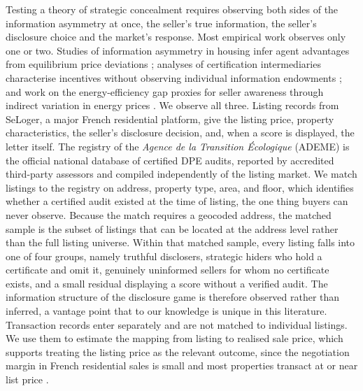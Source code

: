 Testing a theory of strategic concealment requires observing both sides of the information
asymmetry at once, the seller's true information, the seller's disclosure choice and the
market's response. Most empirical work observes only one or two. Studies of information
asymmetry in housing infer agent advantages from equilibrium price deviations
\citep{levitt_syverson_2008}; analyses of certification intermediaries characterise incentives
without observing individual information endowments \citep{lizzeri_1999}; and work on the
energy-efficiency gap proxies for seller awareness through indirect variation in energy prices
\citep{myers_asymmetric_2020}. We observe all three. Listing records from SeLoger, a major
French residential platform, give the listing price, property characteristics, the seller's
disclosure decision, and, when a score is displayed, the letter itself. The registry of the
\emph{Agence de la Transition \'Ecologique} (ADEME) is the official national database of
certified DPE audits, reported by accredited third-party assessors and compiled independently
of the listing market. We match listings to the registry on address, property type, area, and
floor, which identifies whether a certified audit existed at the time of listing, the one
thing buyers can never observe. Because the match requires a geocoded address, the matched
sample is the subset of listings that can be located at the address level rather than the full
listing universe. Within that matched sample, every listing falls into one of four groups, namely
truthful disclosers, strategic hiders who hold a certificate and omit it, genuinely uninformed
sellers for whom no certificate exists, and a small residual displaying a score without a
verified audit. The information structure of the disclosure game is therefore observed rather
than inferred, a vantage point that to our knowledge is unique in this literature. Transaction
records enter separately and are not matched to individual listings. We use them to estimate
the mapping from listing to realised sale price, which supports treating the listing price as
the relevant outcome, since the negotiation margin in French residential sales is small and
most properties transact at or near list price
\citep{merlo_bargaining_2004, genesove_loss_2001, friggit_marche_2013}.

